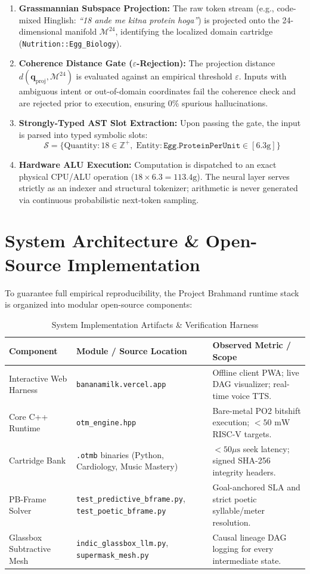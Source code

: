 \documentclass[11pt,a4paper]{article}
\theoremstyle{definition}
\begin{document}
\begin{enumerate}
    \item \textbf{Grassmannian Subspace Projection:} The raw token stream (e.g., code-mixed Hinglish: \textit{``18 ande me kitna protein hoga''}) is projected onto the 24-dimensional manifold $\mathcal{M}^{24}$, identifying the localized domain cartridge (\texttt{Nutrition::Egg\_Biology}).
    \item \textbf{Coherence Distance Gate ($\varepsilon$-Rejection):} The projection distance $d(\mathbf{q}_{\text{proj}}, \mathcal{M}^{24})$ is evaluated against an empirical threshold $\varepsilon$. Inputs with ambiguous intent or out-of-domain coordinates fail the coherence check and are rejected prior to execution, ensuring 0\% spurious hallucinations.
    \item \textbf{Strongly-Typed AST Slot Extraction:} Upon passing the gate, the input is parsed into typed symbolic slots:
    $$\mathcal{S} = \{ \text{Quantity}: 18 \in \mathbb{Z}^+, \; \text{Entity}: \texttt{Egg.ProteinPerUnit} \in [6.3\text{g}] \}$$
    \item \textbf{Hardware ALU Execution:} Computation is dispatched to an exact physical CPU/ALU operation ($18 \times 6.3 = 113.4\text{g}$). The neural layer serves strictly as an indexer and structural tokenizer; arithmetic is never generated via continuous probabilistic next-token sampling.
\end{enumerate}

\section{System Architecture \& Open-Source Implementation}
To guarantee full empirical reproducibility, the Project Brahmand runtime stack is organized into modular open-source components:

\begin{table}[htbp]
\centering
\small
\caption{System Implementation Artifacts \& Verification Harness}
\label{tab:artifacts}
\begin{tabular}{lp{4.8cm}p{4.2cm}}
\toprule
\textbf{Component} & \textbf{Module / Source Location} & \textbf{Observed Metric / Scope} \\
\midrule
Interactive Web Harness & \texttt{bananamilk.vercel.app} & Offline client PWA; live DAG visualizer; real-time voice TTS. \\
Core C++ Runtime & \texttt{otm\_engine.hpp} & Bare-metal PO2 bitshift execution; $<50\text{ mW}$ RISC-V targets. \\
Cartridge Bank & \texttt{.otmb} binaries (Python, Cardiology, Music Mastery) & $<50\mu\text{s}$ seek latency; signed SHA-256 integrity headers. \\
PB-Frame Solver & \texttt{test\_predictive\_bframe.py}, \texttt{test\_poetic\_bframe.py} & Goal-anchored SLA and strict poetic syllable/meter resolution. \\
Glassbox Subtractive Mesh & \texttt{indic\_glassbox\_llm.py}, \texttt{supermask\_mesh.py} & Causal lineage DAG logging for every intermediate state. \\
\bottomrule
\end{tabular}
\end{table}
\end{document}
